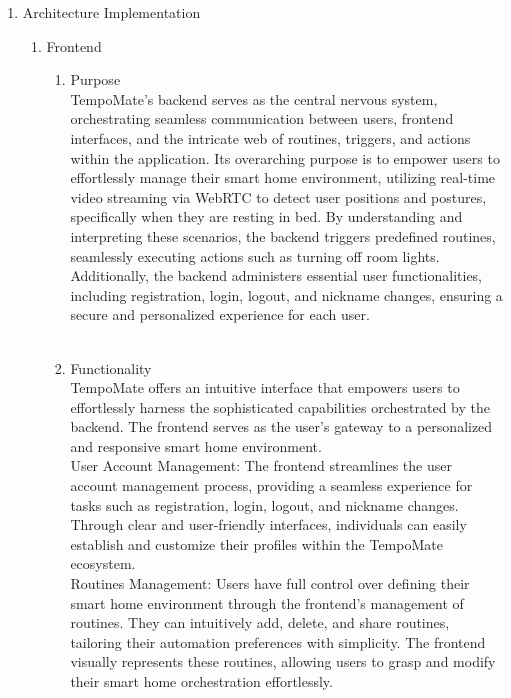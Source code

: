 \begin{enumerate}[label=\arabic*]
    \item {\large{Architecture Implementation}}\\
    \begin{enumerate}[label=\alph*]
        \item Frontend\\
        \begin{enumerate}
            \item Purpose \\
            TempoMate's backend serves as the central nervous system, orchestrating seamless communication between users, frontend interfaces, and the intricate web of routines, triggers, and actions within the application. Its overarching purpose is to empower users to effortlessly manage their smart home environment, utilizing real-time video streaming via WebRTC to detect user positions and postures, specifically when they are resting in bed. By understanding and interpreting these scenarios, the backend triggers predefined routines, seamlessly executing actions such as turning off room lights. Additionally, the backend administers essential user functionalities, including registration, login, logout, and nickname changes, ensuring a secure and personalized experience for each user. \\\\
            \item Functionality \\
            TempoMate offers an intuitive interface that empowers users to effortlessly harness the sophisticated capabilities orchestrated by the backend. The frontend serves as the user's gateway to a personalized and responsive smart home environment.\\

            User Account Management:
            The frontend streamlines the user account management process, providing a seamless experience for tasks such as registration, login, logout, and nickname changes. Through clear and user-friendly interfaces, individuals can easily establish and customize their profiles within the TempoMate ecosystem.\\

            Routines Management:
            Users have full control over defining their smart home environment through the frontend's management of routines. They can intuitively add, delete, and share routines, tailoring their automation preferences with simplicity. The frontend visually represents these routines, allowing users to grasp and modify their smart home orchestration effortlessly.\\


\end{enumerate}
\end{enumerate}
\end{enumerate}
